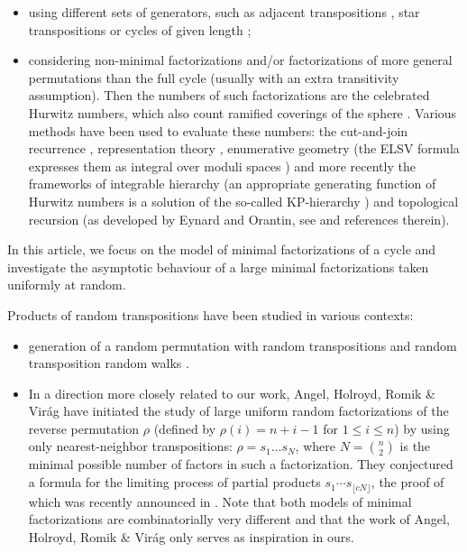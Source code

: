 \documentclass[10pt]{amsart}
\theoremstyle{definition}\newtheorem{defi}[theo]{Definition}\newtheorem{rema}[theo]{Remark}\newtheorem{exam}[theo]{Example}\newtheorem{exem}[theo]{Example}\newtheorem{nota}[theo]{Notation}
\begin{document}
\begin{itemize}
  \item using different sets of generators, such as adjacent transpositions \cite{Sta84,EG87},
    star transpositions \cite{Pak1999,IrvingRattan2009,GouldenJackson2009,Fer12} or cycles of given length \cite{Biane2004};
  \item considering non-minimal factorizations and/or factorizations of more general
    permutations than the full cycle (usually with an extra transitivity assumption).
    Then the numbers of such factorizations are the celebrated Hurwitz numbers,
    which also
    count ramified coverings of the sphere \cite{Hur91}.
    Various methods have been used to evaluate these numbers:
    the cut-and-join recurrence \cite{GJ99A,GJ99B},
    representation theory \cite{Jac88,SSV97}, enumerative geometry
    (the ELSV formula expresses them as integral over moduli spaces \cite{ELSV})
    and more recently the frameworks of integrable hierarchy
    (an appropriate generating function of Hurwitz numbers
    is a solution of the so-called KP-hierarchy \cite{Oko00})
    and topological recursion (as developed by Eynard and Orantin, see \cite{ACEH16}
    and references therein).
\end{itemize}

In this article, we focus on the model of minimal factorizations of a cycle and investigate
the asymptotic behaviour of a large minimal factorizations taken uniformly at random.


Products of random transpositions have been studied in various contexts:
\begin{itemize}
\item generation of a random permutation with random transpositions \cite{DS81,Scr05,DMZZ04} and random transposition random walks \cite{Tot93,BD06,Ber11}.
\item In a direction more closely related to our work, Angel, Holroyd, Romik \& Vir\'ag \cite{AHRV07} have initiated the study of large uniform random factorizations of the reverse permutation $\rho$ (defined by $\rho(i)=n+i-1$ for $1 \leq i \leq n$) by using only nearest-neighbor transpositions:
  \hbox{$\rho=s_1 \dots s_N$},
  where $N=\binom{n}{2}$ is the minimal possible number of factors in such a factorization.
They conjectured a formula for the limiting process of partial products $s_1 \cdots s_{\lfloor c N \rfloor}$,
the proof of which was recently announced in \cite{dauvergne2018archimedean}.
Note that both models of minimal factorizations are combinatorially very different and
that the work of Angel, Holroyd, Romik \& Vir\'ag only serves as inspiration in ours.
\end{itemize}
\end{document}
